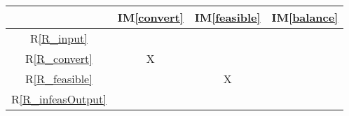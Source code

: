\documentclass[12pt]{article}
\newcommand{\iref}[1]{IM\ref{#1}}
\newcommand{\rref}[1]{R\ref{#1}}
\newcommand{\nfrref}[1]{NFR\ref{#1}}
\begin{document}
\begin{table}[h!]
  \parbox{.45\linewidth}{
    \centering
    \begin{tabular}{|c|c|c|c|}%
      \hline
                                     & \iref{convert} & \iref{feasible} & \iref{balance} \\ %
      \hline
      \rref{R_input}                 &                &                 &                \\ \hline %
      \rref{R_convert}               & X              &                 &                \\ \hline %
      \rref{R_feasible}              &                & X               &                \\ \hline %
      \rref{R_infeasOutput}          &                &                 &                \\ \hline %

\end{tabular}}
\end{table}
\end{document}
